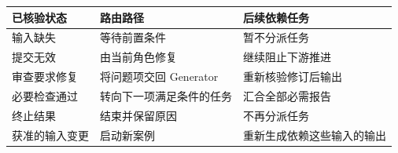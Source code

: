 \begin{tabular}{@{}P{3.6cm}P{4.2cm}P{4.7cm}@{}}
\toprule
\textbf{已核验状态} & \textbf{路由路径} & \textbf{后续依赖任务} \\
\midrule
输入缺失 & 等待前置条件 & 暂不分派任务 \\
提交无效 & 由当前角色修复 & 继续阻止下游推进 \\
审查要求修复 & 将问题项交回 Generator & 重新核验修订后输出 \\
必要检查通过 & 转向下一项满足条件的任务 & 汇合全部必需报告 \\
终止结果 & 结束并保留原因 & 不再分派任务 \\
获准的输入变更 & 启动新案例 & 重新生成依赖这些输入的输出 \\
\bottomrule
\end{tabular}
